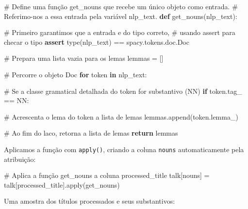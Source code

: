 \documentclass[
  brazilian,
  11pt,
]{article}
\newenvironment{Shaded}{\begin{snugshade}}{\end{snugshade}}
\newcommand{\BuiltInTok}[1]{\textcolor[rgb]{0.50,0.55,0.55}{#1}}
\newcommand{\CommentTok}[1]{\textcolor[rgb]{0.48,0.49,0.49}{#1}}
\newcommand{\ControlFlowTok}[1]{\textcolor[rgb]{0.99,0.74,0.29}{\textbf{#1}}}
\newcommand{\KeywordTok}[1]{\textcolor[rgb]{0.81,0.81,0.76}{\textbf{#1}}}
\newcommand{\NormalTok}[1]{\textcolor[rgb]{0.81,0.81,0.76}{#1}}
\newcommand{\OperatorTok}[1]{\textcolor[rgb]{0.81,0.81,0.76}{#1}}
\newcommand{\StringTok}[1]{\textcolor[rgb]{0.96,0.31,0.31}{#1}}
\let\oldtexttt\texttt
\renewcommand{\texttt}[1]{{\color{inlink}\oldtexttt{#1}}}
\begin{document}
\begin{Shaded}
\begin{Highlighting}[]
\CommentTok{\# Define uma função \textquotesingle{}get\_nouns\textquotesingle{} que recebe um único objeto como entrada.}
\CommentTok{\# Referimo{-}nos a essa entrada pela variável \textquotesingle{}nlp\_text\textquotesingle{}.}
\KeywordTok{def}\NormalTok{ get\_nouns(nlp\_text):}

    \CommentTok{\# Primeiro garantimos que a entrada e do tipo correto,}
    \CommentTok{\# usando \textquotesingle{}assert\textquotesingle{} para checar o tipo}
    \ControlFlowTok{assert} \BuiltInTok{type}\NormalTok{(nlp\_text) }\OperatorTok{==}\NormalTok{ spacy.tokens.doc.Doc}

    \CommentTok{\# Prepara uma lista vazia para os lemas}
\NormalTok{    lemmas }\OperatorTok{=}\NormalTok{ []}

    \CommentTok{\# Percorre o objeto Doc}
    \ControlFlowTok{for}\NormalTok{ token }\KeywordTok{in}\NormalTok{ nlp\_text:}

        \CommentTok{\# Se a classe gramatical detalhada do token for substantivo (NN)}
        \ControlFlowTok{if}\NormalTok{ token.tag\_ }\OperatorTok{==} \StringTok{\textquotesingle{}NN\textquotesingle{}}\NormalTok{:}

            \CommentTok{\# Acrescenta o lema do token a lista de lemas}
\NormalTok{            lemmas.append(token.lemma\_)}

    \CommentTok{\# Ao fim do laco, retorna a lista de lemas}
    \ControlFlowTok{return}\NormalTok{ lemmas}
\end{Highlighting}
\end{Shaded}

Aplicamos a função com \texttt{apply()}, criando a coluna \texttt{nouns}
automaticamente pela atribuição:

\begin{Shaded}
\begin{Highlighting}[]
\CommentTok{\# Aplica a função \textquotesingle{}get\_nouns\textquotesingle{} a coluna \textquotesingle{}processed\_title\textquotesingle{}}
\NormalTok{talk[}\StringTok{\textquotesingle{}nouns\textquotesingle{}}\NormalTok{] }\OperatorTok{=}\NormalTok{ talk[}\StringTok{\textquotesingle{}processed\_title\textquotesingle{}}\NormalTok{].}\BuiltInTok{apply}\NormalTok{(get\_nouns)}
\end{Highlighting}
\end{Shaded}

Uma amostra dos títulos processados e seus substantivos:
\end{document}
